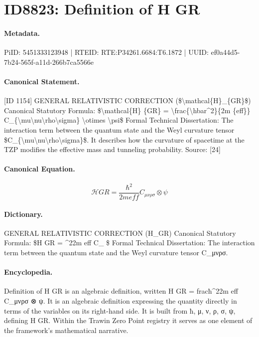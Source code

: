 \section*{ID8823: Definition of H GR}
\paragraph{Metadata.}
PiID: 5451333123948 | RTEID: RTE:P34261.6684:T6.1872 | UUID: ef0a44d5-7b24-565f-a11d-266b7ca5566e

\paragraph{Canonical Statement.}
[ID 1154] GENERAL RELATIVISTIC CORRECTION (\$\textbackslash{}mathcal\{H\}\_\{GR\}\$) Canonical Statutory Formula: \$\textbackslash{}mathcal\{H\} \{GR\} = \textbackslash{}frac\{\textbackslash{}hbar\textasciicircum{}2\}\{2m \{eff\}\} C\_\{\textbackslash{}mu\textbackslash{}nu\textbackslash{}rho\textbackslash{}sigma\} \textbackslash{}otimes \textbackslash{}psi\$ Formal Technical Dissertation: The interaction term between the quantum state and the Weyl curvature tensor \$C\_\{\textbackslash{}mu\textbackslash{}nu\textbackslash{}rho\textbackslash{}sigma\}\$. It describes how the curvature of spacetime at the TZP modifies the effective mass and tunneling probability. Source: [24]

\paragraph{Canonical Equation.}
\[
\mathcal{H} {GR} = \frac{\hbar^2}{2m {eff}} C_{\mu\nu\rho\sigma} \otimes \psi
\]

\paragraph{Dictionary.}
GENERAL RELATIVISTIC CORRECTION (H\_GR) Canonical Statutory Formula: \$H GR = \textasciicircum{}22m eff C\_ \$ Formal Technical Dissertation: The interaction term between the quantum state and the Weyl curvature tensor C\_μνρσ.

\paragraph{Encyclopedia.}
Definition of H GR is an algebraic definition, written H GR = fracħ\textasciicircum{}22m eff C\_μνρσ ⊗ ψ. It is an algebraic definition expressing the quantity directly in terms of the variables on its right-hand side. It is built from ħ, μ, ν, ρ, σ, ψ, defining H GR. Within the Trawin Zero Point registry it serves as one element of the framework's mathematical narrative.
